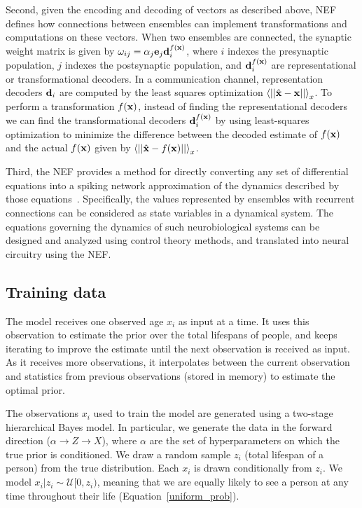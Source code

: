 \documentclass[10pt,letterpaper]{article}
\renewcommand{\vec}[1]{{\bf {#1}}}
\begin{document}
Second, given the encoding and decoding of vectors as described above, NEF defines how connections between ensembles can implement transformations and computations on these vectors. When two ensembles are connected, the synaptic weight matrix is given by $\omega_{ij} = \alpha_j \vec{e}_j \vec{d}_i^{f(\vec{x})}$, where $i$ indexes the presynaptic population, $j$ indexes the postsynaptic population, and $\vec{d}_i^{f(\vec{x})}$ are representational or transformational decoders. In a communication channel, representation decoders $\vec{d}_i$ are computed by the least squares optimization ${\langle||\hat{\vec{x}}-{\vec{x}}||\rangle}_x$. To perform a transformation $f(\vec{x})$, instead of finding the representational decoders we can find the transformational decoders $\vec{d}_i^{f(\vec{x})}$ by using least-squares optimization to minimize the difference between the decoded estimate of $f(\vec{x})$ and the actual $f(\vec{x})$ given by ${\langle||\hat{\vec{x}}-{f(\vec{x})}||\rangle}_x$.

Third, the NEF provides a method for directly converting any set of differential equations into a spiking network approximation of the dynamics described by those equations~\cite{eliasmith2003neural}. Specifically, the values represented by ensembles with recurrent connections can be considered as state variables in a dynamical system. The equations governing the dynamics of such neurobiological systems can be designed and analyzed using control theory methods, and translated into neural circuitry using the NEF. 


\subsection{Training data}
The model receives one observed age $x_i$ as input at a time. It uses this observation to estimate the prior over the total lifespans of people, and keeps iterating to improve the estimate until the next observation is received as input. As it receives more observations, it interpolates between the current observation and statistics from previous observations (stored in memory) to estimate the optimal prior. 

The observations $x_i$ used to train the model are generated using a two-stage hierarchical Bayes model. In particular, we generate the data in the forward direction ($\alpha \longrightarrow Z \longrightarrow X$), where $\alpha$ are the set of hyperparameters on which the true prior is conditioned. We draw a random sample $z_i$ (total lifespan of a person) from the true distribution. Each $x_i$ is drawn conditionally from $z_i$. We model $x_i|z_i \sim \mathcal{U}[0, z_i)$, meaning that we are equally likely to see a person at any time throughout their life (Equation~\ref{uniform_prob}).
\end{document}
